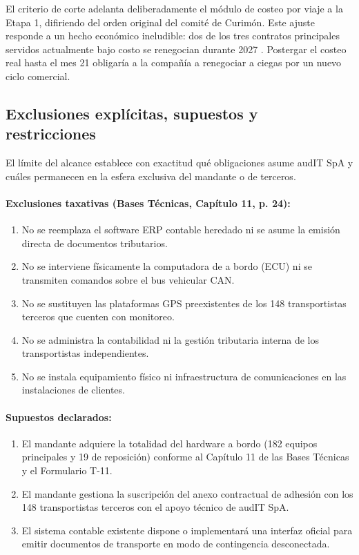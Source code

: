 El criterio de corte adelanta deliberadamente el módulo de costeo por viaje a la Etapa 1, difiriendo del orden
original del comité de Curimón. Este ajuste responde a un hecho económico ineludible: dos de los tres contratos
principales servidos actualmente bajo costo se renegocian durante 2027 . Postergar el
costeo real hasta el mes 21 obligaría a la compañía a renegociar a ciegas por un nuevo ciclo comercial.

\subsection{Exclusiones explícitas, supuestos y restricciones}\label{sec:3-exclusiones}

El límite del alcance establece con exactitud qué obligaciones asume audIT SpA y cuáles permanecen en la esfera
exclusiva del mandante o de terceros.

\paragraph{Exclusiones taxativas (Bases Técnicas, Capítulo 11, p. 24):}
\begin{enumerate}
  \item No se reemplaza el software ERP contable heredado ni se asume la emisión directa de documentos tributarios.
  \item No se interviene físicamente la computadora de a bordo (ECU) ni se transmiten comandos sobre el bus vehicular CAN.
  \item No se sustituyen las plataformas GPS preexistentes de los 148 transportistas terceros que cuenten con monitoreo.
  \item No se administra la contabilidad ni la gestión tributaria interna de los transportistas independientes.
  \item No se instala equipamiento físico ni infraestructura de comunicaciones en las instalaciones de clientes.
\end{enumerate}

\paragraph{Supuestos declarados:}
\begin{enumerate}
  \item El mandante adquiere la totalidad del hardware a bordo (182 equipos principales y 19 de reposición) conforme al Capítulo 11 de las Bases Técnicas y el Formulario T-11.
  \item El mandante gestiona la suscripción del anexo contractual de adhesión con los 148 transportistas terceros con el apoyo técnico de audIT SpA.
  \item El sistema contable existente dispone o implementará una interfaz oficial para emitir documentos de transporte en modo de contingencia desconectada.
\end{enumerate}

